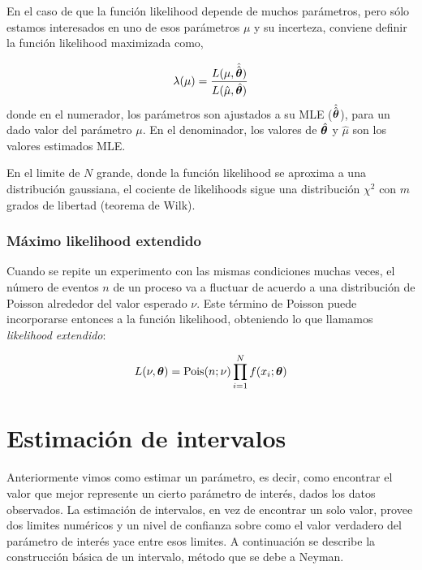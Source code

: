 En el caso de que la función likelihood depende de muchos parámetros, pero sólo
estamos interesados en uno de esos parámetros $\mu$ y su incerteza,
conviene definir la funci\'on likelihood maximizada como,

\begin{equation}
  \lambda(\mu) = \frac{L(\mu,\hat{\hat{\bm{\theta}}})}{L(\hat{\mu},\hat{\bm{\theta}})}
\end{equation}
%
donde en el numerador, los parámetros {\btheta} son ajustados a su MLE
($\hat{\hat{\bm{\theta}}}$), para un dado valor del parámetro $\mu$. En el denominador,
los valores de $\hat{\bm{\theta}}$ y $\hat{\mu}$ son los valores estimados MLE.

En el limite de $N$ grande, donde la función likelihood se aproxima a una
distribución gaussiana, el cociente de likelihoods sigue una distribución
$\chi^2$ con $m$ grados de libertad (teorema de Wilk).


\subsubsection{Máximo likelihood extendido}

Cuando se repite un experimento con las mismas condiciones muchas veces, el
número de eventos $n$ de un proceso va a fluctuar de acuerdo a una distribución
de Poisson alrededor del valor esperado $\nu$. Este término de Poisson puede
incorporarse entonces a la función likelihood, obteniendo lo que llamamos
\emph{likelihood extendido}:

\begin{equation}
  L(\nu,\bm{\theta}) = \operatorname{Pois}(n;\nu) \prod_{i=1}^{N} f(x_i; \bm{\theta})
\end{equation}

\section{Estimación de intervalos}

Anteriormente vimos como estimar un parámetro, es decir, como encontrar el valor
que mejor represente un cierto parámetro de interés, dados los datos observados.
La estimación de intervalos, en vez de encontrar un solo valor, provee dos
limites numéricos y un nivel de confianza sobre como el valor verdadero del
parámetro de interés yace entre esos limites. A continuación se describe la
construcción básica de un intervalo, método que se debe a Neyman.


